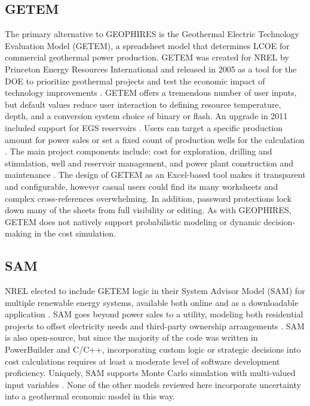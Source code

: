 \subsection{GETEM}\label{ch2:getem}
The primary alternative to GEOPHIRES is the Geothermal Electric Technology Evaluation Model (GETEM), a spreadsheet model that determines LCOE for commercial geothermal power production. GETEM was created for NREL by Princeton Energy Resources International and released in 2005 as a tool for the DOE to prioritize geothermal projects and test the economic impact of technology improvements \citep{entingh_volume_2006}. GETEM offers a tremendous number of user inputs, but default values reduce user interaction to defining resource temperature, depth, and a conversion system choice of binary or flash. An upgrade in 2011 included support for EGS reservoirs \citep{eere_getem_2012}. Users can target a specific production amount for power sales or set a fixed count of production wells for the calculation \citep{mines_geothermal_2008}. The main project components include: cost for exploration, drilling and stimulation, well and reservoir management, and power plant construction and maintenance \citep{entingh_volume_2006}. The design of GETEM as an Excel-based tool makes it transparent and configurable, however casual users could find its many worksheets and complex cross-references overwhelming. In addition, password protections lock down many of the sheets from full visibility or editing. As with GEOPHIRES, GETEM does not natively support probabilistic modeling or dynamic decision-making in the cost simulation.

\subsection{SAM}\label{ch2:sam}
NREL elected to include GETEM logic in their System Advisor Model (SAM) for multiple renewable energy systems, available both online and as a downloadable application \citep{nrel_system_2021}. SAM goes beyond power sales to a utility, modeling both residential projects to offset electricity needs and third-party ownership arrangements \citep{blair_system_2018}. SAM is also open-source, but since the majority of the code was written in PowerBuilder and C/C++, incorporating custom logic or strategic decisions into cost calculations requires at least a moderate level of software development proficiency. Uniquely, SAM supports Monte Carlo simulation with multi-valued input variables \citep{blair_system_2018}. None of the other models reviewed here incorporate uncertainty into a geothermal economic model in this way.

